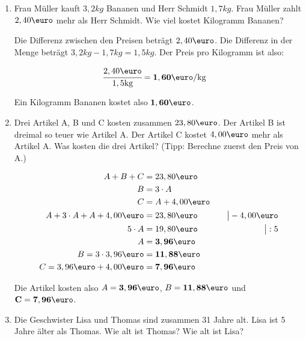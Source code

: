 \documentclass[a4paper,10pt]{article} %
\begin{document}
\begin{enumerate}
    Ein Erwachsenenticket kostet also \(\mathbf{12,90\text{\euro}}\).

  \item Frau Müller kauft \(3,2kg\) Bananen und Herr Schmidt \(1,7kg\).
    Frau Müller zahlt \(2,40\text{\euro}\) mehr als Herr Schmidt.
    Wie viel kostet Kilogramm Bananen?

    Die Differenz zwischen den Preisen beträgt \(2,40\text{\euro}\).
    Die Differenz in der Menge beträgt \(3,2kg - 1,7kg = 1,5kg\).
    Der Preis pro Kilogramm ist also:

    \[
      \begin{aligned}
        \cfrac{2,40\text{\euro}}{1,5\text{kg}} &= \mathbf{1,60\text{\euro}/\text{kg}}
      \end{aligned}
    \]

    Ein Kilogramm Bananen kostet also \(\mathbf{1,60\text{\euro}}\).

  \item Drei Artikel A, B und C kosten zusammen \(23,80\text{\euro}\). Der Artikel B ist
    dreimal so teuer wie Artikel A. Der Artikel C kostet \(4,00\text{\euro}\) mehr als Artikel A.
    Was kosten die drei Artikel? (Tipp: Berechne zuerst den Preis von A.)

    \[
      \begin{aligned}
        A + B + C &= 23,80\text{\euro} \\
        B &= 3 \cdot A \\
        C &= A + 4,00\text{\euro} \\
        A + 3 \cdot A + A + 4,00\text{\euro} &= 23,80\text{\euro} &\quad\big| - 4,00\text{\euro} \\
        5 \cdot A &= 19,80\text{\euro} &\quad\big| : 5 \\
        A &= \mathbf{3,96\text{\euro}} \\
        B = 3 \cdot 3,96\text{\euro} &= \mathbf{11,88\text{\euro}} \\
        C = 3,96\text{\euro} + 4,00\text{\euro} &= \mathbf{7,96\text{\euro}}
      \end{aligned}
    \]

    Die Artikel kosten also \(A = \mathbf{3,96\text{\euro}}\), \(B = \mathbf{11,88\text{\euro}}\)
    und \(\mathbf{C = 7,96\text{\euro}}\).

  \item Die Geschwister Lisa und Thomas sind zusammen 31 Jahre alt.
    Lisa ist 5 Jahre älter als Thomas. Wie alt ist Thomas? Wie alt ist Lisa?


\end{enumerate}
\end{document}
